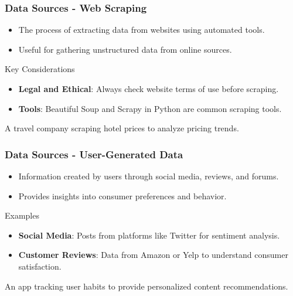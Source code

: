 \documentclass[aspectratio=169]{beamer}
\begin{document}
\begin{frame}[fragile]
    \frametitle{Data Sources - Web Scraping}
    \begin{itemize}
        \item The process of extracting data from websites using automated tools.
        \item Useful for gathering unstructured data from online sources.
    \end{itemize}
    
    \begin{block}{Key Considerations}
        \begin{itemize}
            \item \textbf{Legal and Ethical}: Always check website terms of use before scraping.
            \item \textbf{Tools}: Beautiful Soup and Scrapy in Python are common scraping tools.
        \end{itemize}
    \end{block}

    \begin{example}
        A travel company scraping hotel prices to analyze pricing trends.
    \end{example}
\end{frame}

\begin{frame}[fragile]
    \frametitle{Data Sources - User-Generated Data}
    \begin{itemize}
        \item Information created by users through social media, reviews, and forums.
        \item Provides insights into consumer preferences and behavior.
    \end{itemize}
    
    \begin{block}{Examples}
        \begin{itemize}
            \item \textbf{Social Media}: Posts from platforms like Twitter for sentiment analysis.
            \item \textbf{Customer Reviews}: Data from Amazon or Yelp to understand consumer satisfaction.
        \end{itemize}
    \end{block}

    \begin{example}
        An app tracking user habits to provide personalized content recommendations.
    \end{example}
\end{frame}
\end{document}
